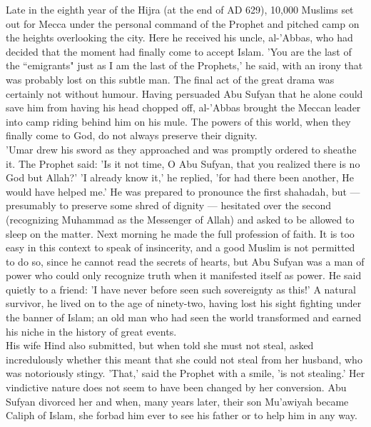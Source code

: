 \documentclass[10pt, twoside]{book}
\begin{document}
Late in the eighth year of the Hijra (at the end of AD 629), 10,000 Muslims set out for Mecca under 
the personal command of the Prophet and pitched camp on the heights overlooking the city. Here he 
received his uncle, al\hyp{}'Abbas, who had decided that the moment had finally come to accept Islam. 'You 
are the last of the ``emigrants" just as I am the last of the Prophets,' he said, with an irony that 
was probably lost on this subtle man. The final act of the great drama was certainly not without 
humour. Having persuaded Abu Sufyan that he alone could save him from having his head chopped off, 
al-'Abbas brought the Meccan leader into camp riding behind him on his mule. The powers of this 
world, when they finally come to God, do not always preserve their dignity. \\

'Umar drew his sword as they approached and was promptly ordered to sheathe it. The Prophet said: 'Is 
it not time, O Abu Sufyan, that you realized there is no God but Allah?' 'I already know it,' he 
replied, 'for had there been another, He would have helped me.' He was prepared to pronounce the 
first shahadah, but --- presumably to preserve some shred of dignity --- hesitated over the second 
(recognizing Muhammad as the Messenger of Allah) and asked to be allowed to sleep on the matter. Next 
morning he made the full profession of faith. It is too easy in this context to speak of insincerity, 
and a good Muslim is not permitted to do so, since he cannot read the secrets of hearts, but Abu 
Sufyan was a man of power who could only recognize truth when it manifested itself as power. He said 
quietly to a friend: 'I have never before seen such sovereignty as this!' A natural survivor, he 
lived on to the age of ninety\hyp{}two, having lost his sight fighting under the banner of Islam; an old 
man who had seen the world transformed and earned his niche in the history of great events. \\

His wife Hind also submitted, but when told she must not steal, asked incredulously whether this 
meant that she could not steal from her husband, who was notoriously stingy. 'That,' said the Prophet 
with a smile, 'is not stealing.' Her vindictive nature does not seem to have been changed by her 
conversion. Abu Sufyan divorced her and when, many years later, their son Mu'awiyah became Caliph of 
Islam, she forbad him ever to see his father or to help him in any way. \\
\end{document}
